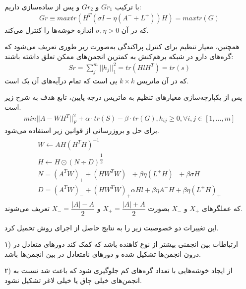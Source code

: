 با ترکیب 
$Gr_1$
و
$Gr_2$
و پس از ساده‌سازی داریم:
\begin{equation}
\begin{aligned}
Gr \equiv max { tr(H^T(\sigma I-\eta (A^-+L^+))H)}=max{ tr(G)}
\end{aligned}
\end{equation}
که در آن
$\sigma,\eta>0$
اندازه خوشه‌ها را کنترل می‌کند.

همچنین، معیار تنظیم 
برای کنترل پراکندگی
به‌صورت زیر طوری تعریف می‌شود که گره‌های دارو در شبکه برهم‌کنش به کمترین انجمن‌های ممکن تعلق داشته باشند:
\begin{equation}
\begin{aligned}
Sr= \sum^m_j||h_j||_1^2 =tr(HlH^T)=tr(s)
\end{aligned}
\end{equation}
که در آن
ماتریس
$k \times k$
یی است که تمام درآیه‌های آن یک است.

پس از یکپارچه‌سازی معیارهای تنظیم به ماتریس درجه پایین، تابع هدف 
به شرح زیر است.
\begin{equation}
\begin{aligned}
min||A-WH^T||_F^2 +\alpha \cdot tr(S) - \beta \cdot tr(G), 
h_{ij}\geq0 , \forall i,j \in [1,...,m]
\end{aligned}
\end{equation}
برای حل و بروز‌رسانی از قوانین زیر استفاده می‌شود.
\begin{equation}
\begin{aligned}
\begin{split}
{W}\longleftarrow{AH(H^TH)^{-1}}
\\
{H}\longleftarrow{H\odot(N\div D)^{\dfrac{1}{2}}}
\\
N=(A^TW)_++(HW^TW)_-+\beta \eta(L^+H)_-+\beta \sigma H
\\
D=(A^TW)_-+(HW^TW)_+\alpha Hl+\beta \eta A^-H+\beta\eta(L^+H)_+
\end{split}
\end{aligned}
\end{equation}
که عملگرهای
$X_+$
و
$X_-$
بصورت
$X_+=\dfrac{|A|+A}{2}$
و
$X_-=\dfrac{|A|-A}{2}$
تعریف می‌شوند.


این تغییرات دو خصوصیت زیر را به نتایج حاصل از اجرای روش تحمیل کرد. 
 
۱) ارتباطات بین انجمنی بیشتر از نوع کاهنده باشد که کمک کند دورهای متعادل در درون انجمن‌ها تشکیل شده و دورهای نامتعادل در بین انجمن‌ها باشد. 

۲) از ایجاد خوشه‌هایی با تعداد گره‌های کم جلوگیری شود که باعث شد نسبت به
انجمن‌های خیلی چاق یا خیلی لاغر تشکیل نشود. 

